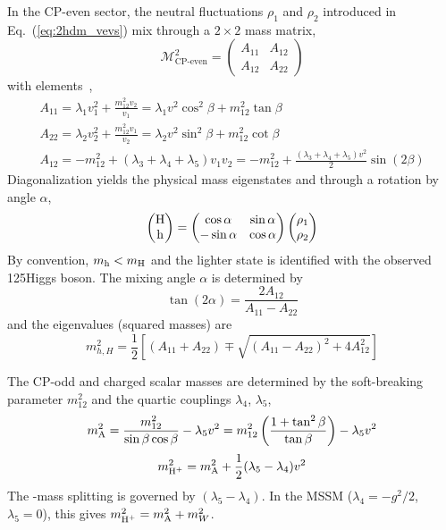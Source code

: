 In the CP-even sector, the neutral fluctuations $\rho_1$ and $\rho_2$ introduced in Eq.~(\ref{eq:2hdm_vevs}) mix through a $2\times2$ mass matrix,
\begin{equation}
\mathcal{M}^2_{\text{CP-even}} = \begin{pmatrix} A_{11} & A_{12} \\ A_{12} & A_{22} \end{pmatrix}
\label{eq:cpeven_mass_matrix}
\end{equation}
with elements~\cite{Branco:2011iw,Gunion:1990dt},
\begin{gather}
A_{11} = \lambda_1 v_1^2 + \frac{m_{12}^2 v_2}{v_1} = \lambda_1 v^2 \cos^2\beta + m_{12}^2 \tan\beta \\
A_{22} = \lambda_2 v_2^2 + \frac{m_{12}^2 v_1}{v_2} = \lambda_2 v^2 \sin^2\beta + m_{12}^2 \cot\beta \\
A_{12} = -m_{12}^2 + (\lambda_3 + \lambda_4 + \lambda_5) v_1 v_2 = -m_{12}^2 + \frac{(\lambda_3 + \lambda_4 + \lambda_5) v^2}{2} \sin(2\beta)
\end{gather}
Diagonalization yields the physical mass eigenstates \Ph and \PH through a rotation by angle $\alpha$,
\begin{equation}
\begin{pmatrix}
\text{H} \\ \text{h} 
\end{pmatrix} 
= 
\begin{pmatrix} 
      \cos\alpha & \sin\alpha \\   
      -\sin\alpha & \cos\alpha 
\end{pmatrix} 
\begin{pmatrix} 
\rho_1 \\ \rho_2 
\end{pmatrix}
\label{eq:cpeven_rotation}
\end{equation}
By convention, $m_{\text{h}} < m_{\text{H}}$ and the lighter state \Ph is identified with the observed 125\GeV Higgs boson. The mixing angle $\alpha$ is determined by
\begin{equation}
\tan(2\alpha) = \frac{2A_{12}}{A_{11} - A_{22}}
\label{eq:alpha_definition}
\end{equation}
and the eigenvalues (squared masses) are
\begin{equation}
m_{h,H}^2 = \frac{1}{2}\left[(A_{11} + A_{22}) \mp \sqrt{(A_{11} - A_{22})^2 + 4A_{12}^2}\right]
\label{eq:cpeven_masses}
\end{equation}

The CP-odd and charged scalar masses are determined by the soft-breaking parameter $m_{12}^2$ and the quartic couplings $\lambda_4$, $\lambda_5$,
\begin{gather}
m_\text{A}^2 = \frac{m_{12}^2}{\sin\beta\cos\beta} - \lambda_5 v^2 = m_{12}^2 \left(\frac{1 + \tan^2\beta}{\tan\beta}\right) - \lambda_5 v^2 \label{eq:mA}
\end{gather}
\begin{gather}
m_{\text{H}^+}^2 = m_\text{A}^2 + \frac{1}{2}(\lambda_5 - \lambda_4)v^2 \label{eq:mHpm}
\end{gather}
The \PHc-\PA mass splitting is governed by $(\lambda_5 - \lambda_4)$. In the MSSM ($\lambda_4 = -g^2/2$, $\lambda_5 = 0$), this gives $m_{\text{H}^+}^2 = m_{\text{A}}^2 + m_W^2$.

